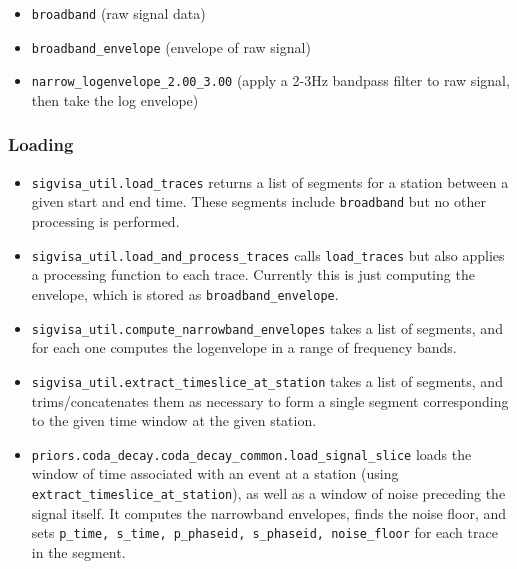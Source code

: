\documentclass{article}
\begin{document}
\begin{itemize} 
\item {\tt broadband} (raw signal data)
\item {\tt broadband\_envelope} (envelope of raw signal)
\item {\tt narrow\_logenvelope\_2.00\_3.00} (apply a 2-3Hz bandpass filter to raw signal, then take the log envelope)
\end{itemize}

\subsubsection{Loading}
\begin{itemize}
\item {\tt sigvisa\_util.load\_traces} returns a list of segments for a station between a given start and end time. These segments include {\tt broadband} but no other processing is performed. 
\item {\tt sigvisa\_util.load\_and\_process\_traces} calls {\tt load\_traces} but also applies a processing function to each trace. Currently this is just computing the envelope, which is stored as {\tt broadband\_envelope}.
\item {\tt sigvisa\_util.compute\_narrowband\_envelopes} takes a list of segments, and for each one computes the logenvelope in a range of frequency bands. 
\item {\tt sigvisa\_util.extract\_timeslice\_at\_station} takes a list of segments, and trims/concatenates them as necessary to form a single segment corresponding to the given time window at the given station. 
\item {\tt priors.coda\_decay.coda\_decay\_common.load\_signal\_slice} loads the window of time associated with an event at a station (using {\tt extract\_timeslice\_at\_station}), as well as a window of noise preceding the signal itself. It computes the narrowband envelopes, finds the noise floor, and sets {\tt p\_time, s\_time, p\_phaseid, s\_phaseid, noise\_floor} for each trace in the segment.
\end{itemize}
\end{document}

